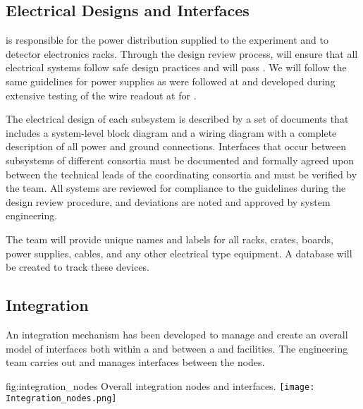 \subsection{Electrical Designs and Interfaces}
\label{sec:es-tc-elec}

 is responsible for the  power
distribution supplied to the experiment and to detector electronics
racks.  Through the design review process,  will  ensure 
that all electrical systems  follow safe design practices and
will pass . We will follow the same  guidelines\cite{bib:cernedms2095958} for  power supplies as
were followed at  and developed during extensive testing of
the  wire readout at  for .  

The electrical design of each subsystem is described by a set of
documents that includes a system-level block diagram and a wiring
diagram with a complete description of all power and ground
connections. Interfaces that occur between subsystems of different consortia must be documented and formally agreed upon between the technical leads of the coordinating 
consortia and must be verified by the  team.  All systems are reviewed for compliance to the guidelines during the design review procedure, and deviations  are noted and approved by system engineering. 

The  team will provide unique names and labels
for all racks, crates, boards, power supplies, cables, and any other
electrical type equipment.  A database will be created to track these
devices.

\subsection{Integration}
\label{sec:es-tc-integ}

 An integration mechanism has been developed to manage and create an overall model of interfaces both within a  and between a  and facilities.
 The  engineering team carries out  and manages interfaces between the nodes.

\begin{dunefigure}{fig:integration_nodes}
  {Overall integration nodes and interfaces.}
  \texttt{[image: Integration\_nodes.png]}
\end{dunefigure}

